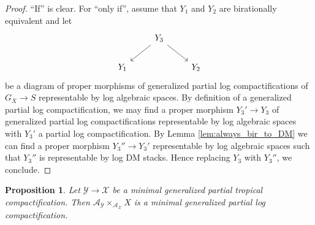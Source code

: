\documentclass[11pt]{amsart}
\newtheorem{proposition}[theorem]{Proposition}
\theoremstyle{definition}
\theoremstyle{remark}
\begin{document}
\begin{proof}
	``If'' is clear. For ``only if'', assume that $Y_1$ and $Y_2$ are birationally equivalent
	and let
	$$\begin{tikzcd}
		&Y_3\arrow[dr]\arrow[dl]&\\
		Y_1&&Y_2
	\end{tikzcd}$$
	be a diagram of proper morphisms of generalized partial log compactifications of $G_X\to S$
	representable by log algebraic spaces. By definition of a generalized partial log compactification, we may find a proper morphism
	$Y_3'\to Y_3$ of generalized partial log compactifications representable by log algebraic
	spaces with $Y_3'$ a partial log compactification. By Lemma \ref{lem:always_bir_to_DM}
	we can find a proper morphism $Y_3''\to Y_3'$ representable by log algebraic spaces
	such that $Y_3''$ is representable by log DM stacks. Hence replacing $Y_3$ with $Y_3''$, we conclude.
\end{proof}

\begin{proposition}
	Let $\mathcal{Y}\to \mathcal{X}$ be a minimal generalized partial tropical compactification. Then $\mathcal{A}_{\mathcal{Y}}\times_{\mathcal{A}_{\mathcal{X}}}X$
	is a minimal generalized partial log compactification.
\end{proposition}
\end{document}
